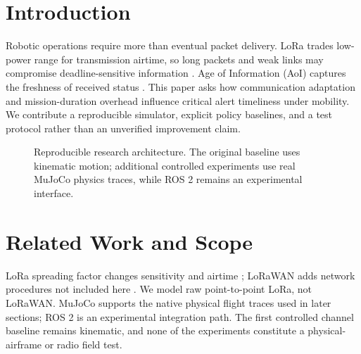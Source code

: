 \documentclass[conference]{IEEEtran}
\begin{document}
\section{Introduction}
Robotic operations require more than eventual packet delivery. LoRa trades low-power range for transmission airtime, so long packets and weak links may compromise deadline-sensitive information \cite{bor,centenaro}. Age of Information (AoI) captures the freshness of received status \cite{kaul}. This paper asks how communication adaptation and mission-duration overhead influence critical alert timeliness under mobility. We contribute a reproducible simulator, explicit policy baselines, and a test protocol rather than an unverified improvement claim.
\begin{figure}[t]
\centering{}
\caption{Reproducible research architecture. The original baseline uses kinematic motion; additional controlled experiments use real MuJoCo physics traces, while ROS 2 remains an experimental interface.}\label{fig:arch}
\end{figure}
\section{Related Work and Scope}
LoRa spreading factor changes sensitivity and airtime \cite{bor}; LoRaWAN adds network procedures not included here \cite{centenaro}. We model raw point-to-point LoRa, not LoRaWAN. MuJoCo \cite{todorov} supports the native physical flight traces used in later sections; ROS 2 \cite{macenski} is an experimental integration path. The first controlled channel baseline remains kinematic, and none of the experiments constitute a physical-airframe or radio field test.
\end{document}
